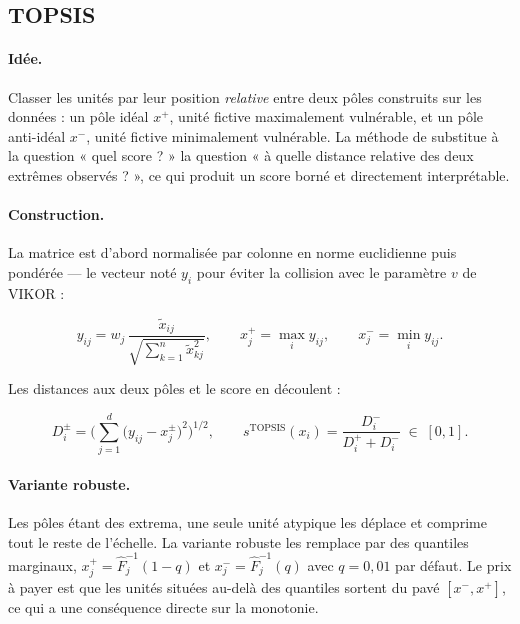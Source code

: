 \documentclass[11pt,a4paper]{article}
\theoremstyle{definition}
\theoremstyle{remark}
\begin{document}
\bigskip

\subsection{TOPSIS}
\label{sec:topsis}

\medskip

\paragraph{Idée.} Classer les unités par leur position \emph{relative} entre deux pôles
construits sur les données : un pôle idéal $x^{+}$, unité fictive maximalement vulnérable,
et un pôle anti-idéal $x^{-}$, unité fictive minimalement vulnérable. La méthode de
\citet{hwang1981} substitue à la question « quel score ? » la question « à quelle distance
relative des deux extrêmes observés ? », ce qui produit un score borné et directement
interprétable.

\medskip

\paragraph{Construction.} La matrice est d'abord normalisée par colonne en norme
euclidienne puis pondérée --- le vecteur noté $y_{i}$ pour éviter la collision avec le
paramètre $v$ de VIKOR :

\medskip

\[
  y_{ij} = w_j\,\frac{\tilde{x}_{ij}}{\sqrt{\sum_{k=1}^{n}\tilde{x}_{kj}^{2}}},
  \qquad
  x^{+}_j = \max_i y_{ij},
  \qquad
  x^{-}_j = \min_i y_{ij} .
\]

\bigskip

Les distances aux deux pôles et le score en découlent :

\medskip

\[
  D^{\pm}_i = \Big(\sum_{j=1}^{d} \big(y_{ij} - x^{\pm}_j\big)^{2}\Big)^{1/2},
  \qquad
  s^{\mathrm{TOPSIS}}(x_i) = \frac{D^{-}_i}{D^{+}_i + D^{-}_i} \;\in\; [0,1] .
\]

\bigskip

\paragraph{Variante robuste.} Les pôles étant des extrema, une seule unité atypique les
déplace et comprime tout le reste de l'échelle. La variante robuste les remplace par des
quantiles marginaux, $x^{+}_j = \hat{F}_j^{-1}(1 - q)$ et $x^{-}_j = \hat{F}_j^{-1}(q)$
avec $q = 0{,}01$ par défaut. Le prix à payer est que les unités situées au-delà des
quantiles sortent du pavé $[x^{-}, x^{+}]$, ce qui a une conséquence directe sur la
monotonie.
\end{document}
